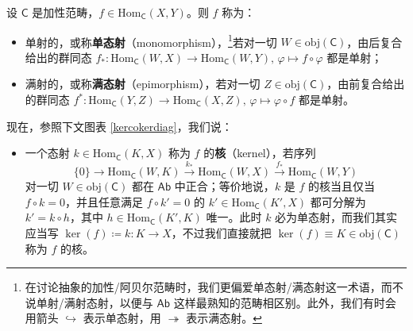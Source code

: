 \begin{Def}\label{monepicoker}
	设 $\mathsf{C}$ 是加性范畴，$f\in\text{Hom}_\mathsf{C}(X,Y)$。则 $f$ 称为：
	\begin{itemize}[leftmargin=0.5cm]
		\item 单射的，或称\textbf{单态射}（monomorphism），\footnote{在讨论抽象的加性/阿贝尔范畴时，我们更偏爱单态射/满态射这一术语，而不说单射/满射态射，以便与 $\mathsf{Ab}$ 这样最熟知的范畴相区别。此外，我们有时会用箭头 $\hookrightarrow$ 表示单态射，用 $\twoheadrightarrow$ 表示满态射。}若对一切 $W\in\text{obj}(\mathsf{C})$，由后复合给出的群同态 $f_*:\text{Hom}_\mathsf{C}(W,X)\rightarrow\text{Hom}_\mathsf{C}(W,Y),\,\varphi\mapsto f\circ\varphi$ 都是单射；

		\item 满射的，或称\textbf{满态射}（epimorphism），若对一切 $Z\in\text{obj}(\mathsf{C})$，由前复合给出的群同态 $f^*:\text{Hom}_\mathsf{C}(Y,Z)\rightarrow\text{Hom}_\mathsf{C}(X,Z),\,\varphi\mapsto\varphi\circ f$ 都是单射。
	\end{itemize}
	现在，参照下文图表 \eqref{kercokerdiag}，我们说：
	\begin{itemize}[leftmargin=0.5cm]
		\item 一个态射 $k\in\text{Hom}_\mathsf{C}(K,X)$ 称为 $f$ 的\textbf{核}（kernel），若序列
		\[
		\{0\}\rightarrow\text{Hom}_\mathsf{C}(W,K)\xrightarrow{k_*}\text{Hom}_\mathsf{C}(W,X)\xrightarrow{f_*}\text{Hom}_\mathsf{C}(W,Y)
		\]
		对一切 $W\in\text{obj}(\mathsf{C})$ 都在 $\mathsf{Ab}$ 中正合；等价地说，$k$ 是 $f$ 的核当且仅当 $f\circ k=0$，并且任意满足 $f\circ k'=0$ 的 $k'\in\text{Hom}_\mathsf{C}(K',X)$ 都可分解为 $k'=k\circ h$，其中 $h\in\text{Hom}_\mathsf{C}(K',K)$ 唯一。此时 $k$ 必为单态射，而我们其实应当写 $\ker(f)\coloneqq k:K\rightarrow X$，不过我们直接就把 $\ker(f)\equiv K \in\text{obj}(\mathsf{C})$ 称为 $f$ 的核。


\end{itemize}
\end{Def}
